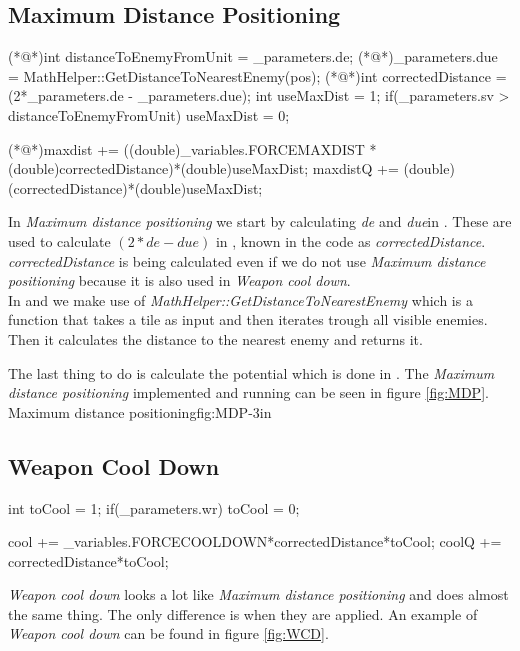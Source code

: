	\subsection{Maximum Distance Positioning}
		\begin{Sourcecode}[caption=Maximum distance]
(*@\lnote@*)int distanceToEnemyFromUnit = _parameters.de;
(*@\lnote@*)_parameters.due = MathHelper::GetDistanceToNearestEnemy(pos);
(*@\lnote@*)int correctedDistance = (2*_parameters.de - _parameters.due);
int useMaxDist = 1;
if(_parameters.sv > distanceToEnemyFromUnit)
	useMaxDist = 0;

(*@\lnote@*)maxdist += ((double)_variables.FORCEMAXDIST * (double)correctedDistance)*(double)useMaxDist;
maxdistQ += (double)(correctedDistance)*(double)useMaxDist;
\end{Sourcecode}
	
	In \textit{Maximum distance positioning} we start by calculating \textit{de} and \textit{due}in  . These are used to calculate $(2*de - due)$ in , known in the code as \textit{correctedDistance}. \\
	
	\textit{correctedDistance} is being calculated even if we do not use \textit{Maximum distance positioning} because it is also used in \textit{Weapon cool down}. \\
	
	In  and  we make use of \textit{MathHelper::GetDistanceToNearestEnemy} which is a function that takes a tile as input and then iterates trough all visible enemies. Then it calculates the distance to the nearest enemy and returns it.
	
	The last thing to do is calculate the potential which is done in . The \textit{Maximum distance positioning} implemented and running can be seen in figure \ref{fig:MDP}. \\

	
			{Maximum distance positioning}{fig:MDP}{-3in}

	\subsection{Weapon Cool Down}
		\begin{Sourcecode}[caption=Weapon cool down]
int toCool = 1;
if(_parameters.wr)
	toCool = 0;
	
cool += _variables.FORCECOOLDOWN*correctedDistance*toCool;
coolQ += correctedDistance*toCool;
\end{Sourcecode}	
	\textit{Weapon cool down} looks a lot like \textit{Maximum distance positioning} and does almost the same thing. The only difference is when they are applied. An example of \textit{Weapon cool down} can be found in figure \ref{fig:WCD}.
	
